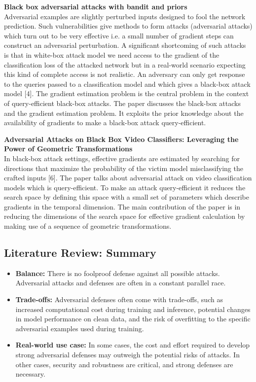 \textbf{Black box adversarial attacks with bandit and priors}\\
Adversarial examples are slightly perturbed inputs designed to fool the network prediction. Such vulnerabilities give methods to form attacks (adversarial attacks) which turn out to be very effective i.e. a small number of gradient steps can construct an adversarial perturbation. A significant shortcoming of such attacks is that in white-box attack model we need access to the gradient of the classification loss of the attacked network but in a real-world scenario expecting this kind of complete access is not realistic. An adversary can only get response to the queries passed to a classification model and which gives a black-box attack model [4]. The gradient estimation problem is the central problem in the context of query-eﬃcient black-box attacks. The paper discusses the black-box attacks and the gradient estimation problem. It exploits the prior knowledge about the availability of gradients to make a black-box attack query-efficient.

\textbf{Adversarial Attacks on Black Box Video Classiﬁers: Leveraging the Power of Geometric Transformations}\\
In black-box attack settings, effective gradients are estimated by searching for directions that maximize the probability of the victim model misclassifying the crafted inputs [6]. The paper talks about adversarial attack on video classification models which is query-efficient. To make an attack query-efficient it reduces the search space by defining this space with a small set of parameters which describe gradients in the temporal dimension. The main contribution of the paper is in reducing the dimensions of the search space for effective gradient calculation by making use of a sequence of geometric transformations.



\subsection{Literature Review: Summary}
\begin{itemize}
  \item \textbf{Balance:} There is no foolproof defense against all possible attacks. Adversarial attacks and defenses are often in a constant parallel race. 

  \item \textbf{Trade-offs:} Adversarial defenses often come with trade-offs, such as increased computational cost during training and inference, potential changes in model performance on clean data, and the risk of overfitting to the specific adversarial examples used during training.

  \item \textbf{Real-world use case:} In some cases, the cost and effort required to develop strong adversarial defenses may outweigh the potential risks of attacks. In other cases, security and robustness are critical, and strong defenses are necessary.


\end{itemize}

